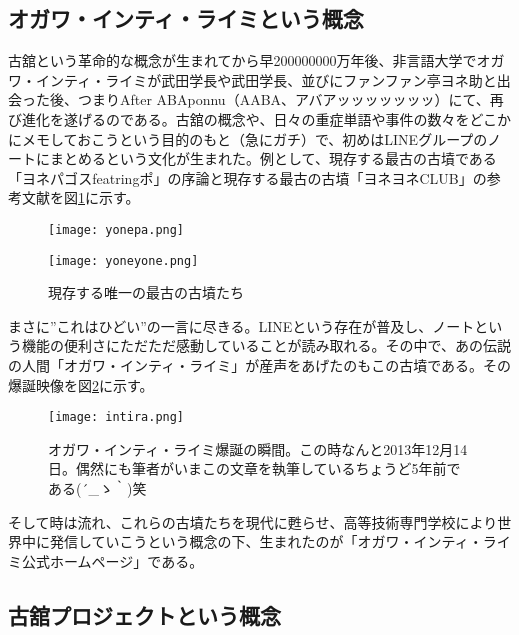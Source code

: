 \subsection{オガワ・インティ・ライミという概念}

古舘という革命的な概念が生まれてから早200000000万年後、非言語大学でオガワ・インティ・ライミが武田学長や武田学長、並びにファンファン亭ヨネ助と出会った後、つまりAfter ABAponnu（AABA、アバアッッッッッッッ）にて、再び進化を遂げるのである。古舘の概念や、日々の重症単語や事件の数々をどこかにメモしておこうという目的のもと（急にガチ）で、初めはLINEグループのノートにまとめるという文化が生まれた。例として、現存する最古の古墳である「ヨネパゴスfeatringポ」の序論と現存する最古の古墳「ヨネヨネCLUB」の参考文献を図\ref{yone}に示す。\\
\begin{figure}[h]
    \centering
  \begin{minipage}{0.5\linewidth}
    \centering
    \texttt{[image: yonepa.png]}
  \end{minipage}
  \begin{minipage}{0.4\linewidth}
    \centering
    \texttt{[image: yoneyone.png]}
  \end{minipage}
  \caption{現存する唯一の最古の古墳たち}
  \label{yone}
 \end{figure}

まさに”これはひどい”の一言に尽きる。LINEという存在が普及し、ノートという機能の便利さにただただ感動していることが読み取れる。その中で、あの伝説の人間「オガワ・インティ・ライミ」が産声をあげたのもこの古墳である。その爆誕映像を図\ref{intira}に示す。\\

\begin{figure}[H]
  \centering
  \texttt{[image: intira.png]}
  \caption{オガワ・インティ・ライミ爆誕の瞬間。この時なんと2013年12月14日。偶然にも筆者がいまこの文章を執筆しているちょうど5年前である\sf (´\_ゝ｀)笑}
\label{intira}
\end{figure}

そして時は流れ、これらの古墳たちを現代に甦らせ、高等技術専門学校により世界中に発信していこうという概念の下、生まれたのが「オガワ・インティ・ライミ公式ホームページ」である。
\subsection{古舘プロジェクトという概念}

